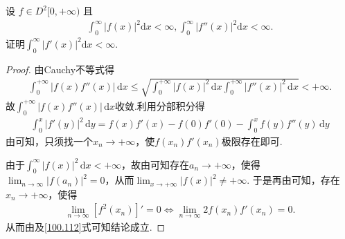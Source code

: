 \documentclass[../../main.tex]{subfiles}%
\begin{document}
\begin{example}
设 $f \in D^2[0, +\infty)$ 且
\begin{align*}
\int_0^{\infty} |f(x)|^2 \mathrm{d}x < \infty, \int_0^{\infty} |f''(x)|^2 \mathrm{d}x < \infty.
\end{align*}
证明$\int_0^{\infty} |f'(x)|^2 \mathrm{d}x < \infty$.
\end{example}
\begin{proof}

由Cauchy不等式得
\begin{align*}
\int_0^{+\infty}|f(x)f''(x)|\,\mathrm{d}x\leqslant\sqrt{\int_0^{+\infty}|f(x)|^2\,\mathrm{d}x\int_0^{+\infty}|f''(x)|^2\,\mathrm{d}x}<+\infty.
\end{align*}
故$\int_0^{+\infty}|f(x)f''(x)|\,\mathrm{d}x$收敛.利用分部积分得
\begin{align}\label{100.112}
\int_0^x|f'(y)|^2\,\mathrm{d}y=f(x)f'(x)-f(0)f'(0)-\int_0^x f(y)f''(y)\,\mathrm{d}y
\end{align}
由可知，只须找一个$x_n\rightarrow+\infty$，使$f(x_n)f'(x_n)$极限存在即可.

由于$\int_0^{\infty}|f(x)|^2\,\mathrm{d}x<+\infty$，故由可知存在$a_n\rightarrow+\infty$，使得$\lim_{n\rightarrow\infty}|f(a_n)|^2=0$，从而$\lim_{x\rightarrow+\infty}|f(x)|^2\ne+\infty$.
于是再由可知，存在$x_n\rightarrow+\infty$，使得
\begin{align*}
\lim_{n\rightarrow\infty}[f^2(x_n)]'=0\Longleftrightarrow\lim_{n\rightarrow\infty}2f(x_n)f'(x_n)=0.
\end{align*}
从而由及\eqref{100.112}式可知结论成立.

\end{proof}
\end{document}

